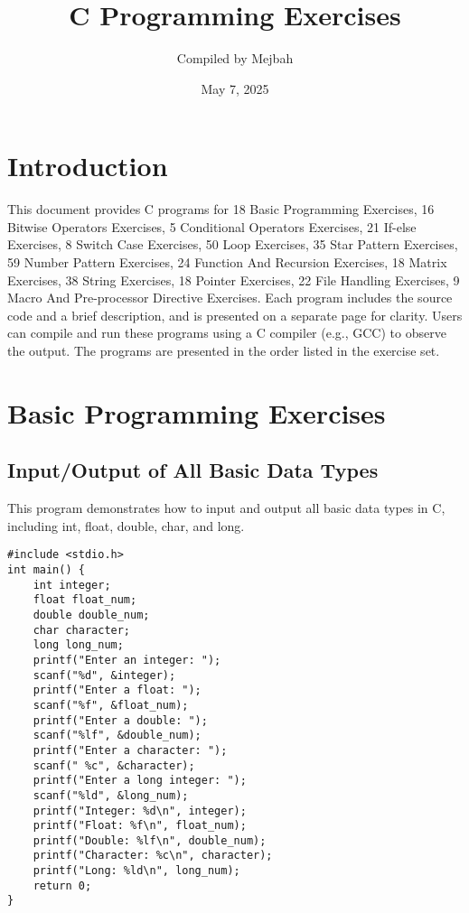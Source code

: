 \documentclass[a4paper,12pt]{article}
\title{C Programming Exercises}
\author{Compiled by Mejbah}
\date{May 7, 2025}
\begin{document}
\maketitle

\tableofcontents
\newpage

\section{Introduction}
This document provides C programs for 18 Basic Programming Exercises, 16 Bitwise Operators Exercises, 5 Conditional Operators Exercises, 21 If-else Exercises, 8 Switch Case Exercises, 50 Loop Exercises, 35 Star Pattern Exercises, 59 Number Pattern Exercises, 24 Function And Recursion Exercises, 18 Matrix Exercises, 38 String Exercises, 18 Pointer Exercises, 22 File Handling Exercises, 9 Macro And Pre-processor Directive Exercises. Each program includes the source code and a brief description, and is presented on a separate page for clarity. Users can compile and run these programs using a C compiler (e.g., GCC) to observe the output. The programs are presented in the order listed in the exercise set.

\newpage

\section{Basic Programming Exercises}

\subsection{Input/Output of All Basic Data Types}
This program demonstrates how to input and output all basic data types in C, including int, float, double, char, and long.

\begin{lstlisting}[caption={Input/Output of All Basic Data Types}]
#include <stdio.h>
int main() {
    int integer;
    float float_num;
    double double_num;
    char character;
    long long_num;
    printf("Enter an integer: ");
    scanf("%d", &integer);
    printf("Enter a float: ");
    scanf("%f", &float_num);
    printf("Enter a double: ");
    scanf("%lf", &double_num);
    printf("Enter a character: ");
    scanf(" %c", &character);
    printf("Enter a long integer: ");
    scanf("%ld", &long_num);
    printf("Integer: %d\n", integer);
    printf("Float: %f\n", float_num);
    printf("Double: %lf\n", double_num);
    printf("Character: %c\n", character);
    printf("Long: %ld\n", long_num);
    return 0;
}
\end{lstlisting}
\end{document}
